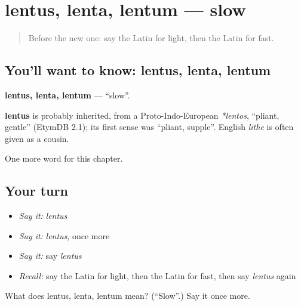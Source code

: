 \section[lentus, lenta, lentum]{lentus, lenta, lentum — slow}

\label{lesson:LA-C94-lentus}



\begin{quote}
Before the new one: say the Latin for light, then the Latin for fast.
\end{quote}

\subsection*{You'll want to know: lentus, lenta, lentum}
\textbf{lentus, lenta, lentum} — \textquotedblleft{}slow\textquotedblright{}.

\begin{cousinweb}
\textbf{lentus} is probably inherited, from a Proto-Indo-European \emph{*lentos}, \textquotedblleft{}pliant, gentle\textquotedblright{} (EtymDB 2.1); its first sense was \textquotedblleft{}pliant, supple\textquotedblright{}. English \emph{lithe} is often given as a cousin.
\end{cousinweb}

\begin{grammarlens}[title={What you've built}]
One more word for this chapter.
\end{grammarlens}

\subsection*{Your turn}
\begin{itemize}
\raggedright
  \item \emph{Say it:} \emph{lentus}
  \item \emph{Say it:} \emph{lentus}, once more
  \item \emph{Say it:} say \emph{lentus}
  \item \emph{Recall:} say the Latin for light, then the Latin for fast, then say \emph{lentus} again
\end{itemize}

\begin{tcolorbox}[breakable,colback=teal!4,colframe=teal!35!black,title={Before you move on}]
What does lentus, lenta, lentum mean? (\textquotedblleft{}Slow\textquotedblright{}.) Say it once more.
\end{tcolorbox}
